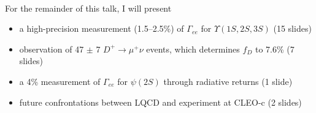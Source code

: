 \documentclass[landscape]{article}
\newenvironment{slide}[1][ ]{\mbox{\bf #1 } \vfill}{\vfill \mbox{ } \pagebreak}
\begin{document}




\begin{slide}

For the remainder of this talk, I will present

\vspace{1.5 cm}
\begin{itemize}\setlength{\itemsep}{1.5 cm}

  \item a high-precision measurement (1.5--2.5\%) of $\Gamma_{ee}$ for
  $\Upsilon(1S,2S,3S)$ \hfill (15 slides)

  \item observation of 47 $\pm$ 7 $D^+ \to \mu^+ \nu$ events, which
    determines $f_D$ to 7.6\% \hfill (7 slides)

  \item a 4\% measurement of $\Gamma_{ee}$ for $\psi(2S)$ through
    radiative returns \hfill (1 slide)

  \item future confrontations between LQCD and experiment at CLEO-c \hfill (2 slides)

\end{itemize}

\end{slide}


\end{document}
